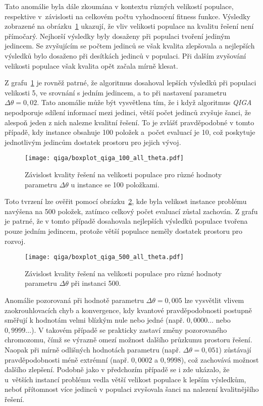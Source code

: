 Tato anomálie byla dále zkoumána v kontextu různých velikostí populace, respektive v~závislosti na celkovém počtu vyhodnocení fitness funkce. 
Výsledky zobrazené na obrázku~\ref{fig:qiga-100-all} ukazují, že vliv velikosti populace na kvalitu řešení není přímočarý. 
Nejhorší výsledky byly dosaženy při populaci tvoření jediným jedincem. 
Se zvyšujícím se počtem jedinců se však kvalita zlepšovala a nejlepších výsledků bylo dosaženo při desítkách jedinců v populaci. 
Při dalším zvyšování velikosti populace však kvalita opět začala mírně klesat.

Z grafu~\ref{fig:qiga-100-all} je rovněž patrné, že algoritmus dosahoval lepších výsledků při populaci velikosti 5, ve srovnání s jedním jedincem, a to při nastavení parametru $\Delta\theta = 0,02$.  
Tato anomálie může být vysvětlena tím, že i když algoritmus \emph{QIGA} nepodporuje sdílení informací mezi jedinci, větší počet jedinců zvyšuje šanci, že alespoň jeden z nich nalezne kvalitní řešení. 
To je zvlášť pravděpodobné v tomto případě, kdy instance obsahuje 100 položek a~počet evaluací je 10, což poskytuje jednotlivým jedincům dostatek prostoru pro jejich vývoj. 

\begin{figure}[ht!]
    \centering
    \texttt{[image: qiga/boxplot\_qiga\_100\_all\_theta.pdf]}
    \caption{Závislost kvality řešení na velikosti populace pro různé hodnoty parametru $\Delta\theta$ u instance se 100 položkami.}
    \label{fig:qiga-100-all}
\end{figure}

Toto tvrzení lze ověřit pomocí obrázku~\ref{fig:qiga-500-all}, kde byla velikost instance problému navýšena na 500 položek, zatímco celkový počet evaluací zůstal zachován. 
Z grafu je patrné, že v tomto případě dosahovala nejlepších výsledků populace tvořena pouze jedním jedincem, protože větší populace neměly dostatek prostoru pro rozvoj.

\begin{figure}[ht!]
    \centering
    \texttt{[image: qiga/boxplot\_qiga\_500\_all\_theta.pdf]}
    \caption{Závislost kvality řešení na velikosti populace pro různé hodnoty parametru $\Delta\theta$ při instanci 500.}
    \label{fig:qiga-500-all}
\end{figure}

Anomálie pozorovaná při hodnotě parametru $\Delta\theta = 0,005$ lze vysvětlit vlivem zaokrouhlovacích chyb a konvergence, kdy kvantové pravděpodobnosti postupně směřují k hodnotám velmi blízkým nule nebo jedné (např. $0,0000\dots$ nebo $0,9999\dots$). 
V takovém případě se prakticky zastaví změny pozorovaného chromozomu, čímž se výrazně omezí možnost dalšího průzkumu prostoru řešení.  
Naopak při mírně odlišných hodnotách parametru (např. $\Delta\theta = 0,051$) zůstávají pravděpodobnosti méně extrémní (např. $0,0002$ a $0,9998$), což zachovává možnost dalšího zlepšení. 
Podobně jako v předchozím případě se i zde ukázalo, že u~větších instancí problému vedla větší velikost populace k lepším výsledkům, neboť přítomnost více jedinců v populaci zvyšovala šanci na nalezení kvalitnějšího řešení.

